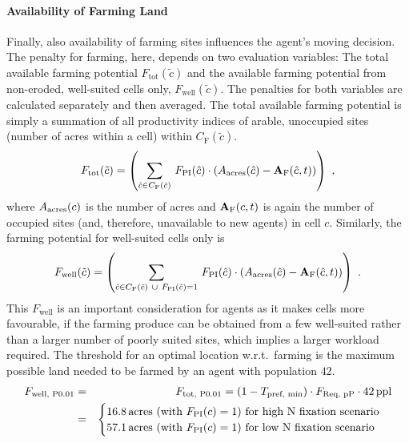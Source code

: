 \paragraph{Availability of Farming Land}%
Finally, also availability of farming sites influences the agent's moving decision.
The penalty for farming, here, depends on two evaluation variables: 
The total available farming potential $F_\text{tot}(\tilde{c})$ and the available farming potential from non-eroded, well-suited cells only, $F_\text{well}(\tilde{c})$.
The penalties for both variables are calculated separately and then averaged.
The total available farming potential is simply a summation of all productivity indices of arable, unoccupied sites (number of acres within a cell) within $C_\text{F}(\tilde{c})$.
\begin{equation}
	F_\text{tot}(\tilde{c}) = \left( \sum_{\hat{c} \in C_{\rm F}(\tilde{c}) }\, F_{\rm PI}(\hat{c}) \cdot (A_{\rm acres}(\hat{c})  - \mathbf{A}_{\rm F}(\hat{c}, t) )\right) \ ,
\end{equation}
where $A_{\rm acres}(c)$ is the number of acres and $ \mathbf{A}_{\rm F}(c,t)$ is again the number of occupied sites (and, therefore, unavailable to new agents) in cell $c$.
Similarly, the farming potential for well-suited cells only is 
\begin{equation}
	F_\text{well}(\tilde{c}) = \left( \sum_{\hat{c} \in C_{\rm F}(\tilde{c}) \ \cup \ F_{\rm PI}(\hat{c})=1} \, F_{\rm PI}(\hat{c}) \cdot (A_{\rm acres}(\hat{c})  - \mathbf{A}_{\rm F}(\hat{c},t) )\right) \ .
\end{equation}
This $F_\text{well}$ is an important consideration for agents as it makes cells more favourable, if the farming produce can be obtained from a few well-suited rather than a larger number of poorly suited sites, which implies a larger workload required.
The threshold for an optimal location w.r.t.\ farming is the maximum possible land needed to be farmed by an agent with population $42$.
\begin{eqnarray}
F_\text{well, P0.01} & = & F_\text{tot, P0.01} =  (1-T_\text{pref, min})\cdot F_\text{Req, pP} \cdot 42\, {\rm ppl}  \\
& = & 
\begin{cases} 16.8\, {\rm acres}  \text{ (with }F_{\rm PI}(c)=1\text{) for high N fixation scenario} \\  57.1 \, {\rm acres} \text{ (with }F_{\rm PI}(c)=1\text{) for low N fixation scenario} \nonumber
\end{cases} 
\end{eqnarray}
